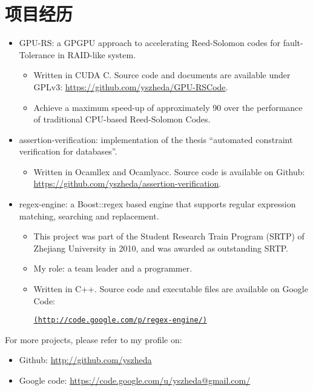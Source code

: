 \documentclass[letterpaper]{article}
\begin{document}
\section*{项目经历}
\begin{itemize}
  \item GPU-RS: a GPGPU approach to accelerating Reed-Solomon codes for fault-Tolerance in RAID-like system.
	\begin{itemize}
	  \item Written in CUDA C. Source code and documents are available under GPLv3: \url{https://github.com/yszheda/GPU-RSCode}.
	  \item Achieve a maximum speed-up of approximately 90 over the performance of traditional CPU-based Reed-Solomon Codes.
	\end{itemize}
  \item assertion-verification: implementation of the thesis ``automated constraint verification for databases''.
	\begin{itemize}
	  \item Written in Ocamllex and Ocamlyacc. Source code is available on Github: \\ \url{https://github.com/yszheda/assertion-verification}.
	\end{itemize}
  \item regex-engine: a Boost::regex based engine that supports regular expression matching, searching and replacement.
    \begin{itemize}
	  \item This project was part of the Student Research Train Program (SRTP) of Zhejiang University in 2010, and was awarded as outstanding SRTP.
	\item My role: a team leader and a programmer.
	\item Written in C++. Source code and executable files are available on Google Code:

	  \href{http://code.google.com/p/regex-engine/}{\tt (http://code.google.com/p/regex-engine/)}
	\end{itemize}

\end{itemize}

For more projects, please refer to my profile on:
\begin{itemize}
  \item Github: \url{http://github.com/yszheda} 
  \item Google code: \url{https://code.google.com/u/yszheda@gmail.com/}
\end{itemize}
\end{document}

